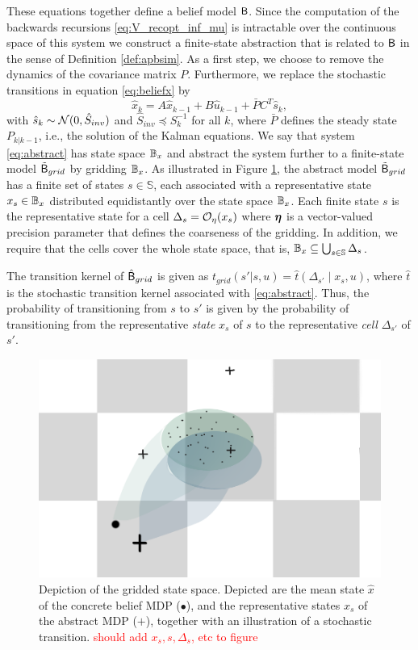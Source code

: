 \documentclass{ifacconf}
\begin{document}
These equations together define a belief model $\mathsf{B}$. Since the computation of the backwards recursions \eqref{eq:V_recopt_inf_mu} is intractable over the continuous space of this system we construct a finite-state abstraction that is related to $\mathsf{B}$ in the sense of Definition \ref{def:apbsim}. As a first step, we choose to remove the dynamics of the covariance matrix $P$. Furthermore, we replace the stochastic transitions in equation \eqref{eq:beliefx} by
\begin{equation}
		\hat x_k  = A\hat x_{k-1} +B\hat u_{k-1} + \bar P  C^T  \hat{s}_k,\label{eq:abstract}
\end{equation}
with $ \hat{s}_k\sim \mathcal{N} (0,\hat{S}_{inv})$ and $\hat{S}_{inv}\preceq S_k^{-1}$ for all $k$, where $\bar P$ defines the steady state $P_{k|k-1}$, i.e., the solution of the Kalman equations. We say that system \eqref{eq:abstract} has state space $\mathbb{B}_{x}$ and abstract the system further to a finite-state model $\tilde {\mathsf{B}}_{grid}$ by gridding $\mathbb{B}_x$. As illustrated in Figure \ref{fig:grid}, the abstract model $\tilde {\mathsf{B}}_{grid}$ has a finite set of states $s \in \mathbb{S}$, each associated with a representative state $x_s \in \mathbb{B}_x$ distributed equidistantly over the state space $\mathbb{B}_x$. Each finite state $s$ is the representative state for a cell $\Delta_{s}= \mathcal{O}_\eta(x_s)$ where ${\boldsymbol{\eta}}$ is a vector-valued precision parameter that defines the coarseness of the gridding. In addition, we require that the cells cover the whole state space, that is, $\mathbb{B}_x \subseteq \bigcup_{s \in \mathbb{S}} \Delta_{s}$.

The transition kernel of $\hat{\mathsf{B}}_{grid}$ is given as $t_{grid}(s'|s,u)=\hat t \left(\Delta_{s'}\mid x_s, u\right)$, where $\hat t$ is the stochastic transition kernel associated with \eqref{eq:abstract}. Thus, the probability of transitioning from $s$ to $s'$ is given by the probability of transitioning from the representative \emph{state} $x_s$ of $s$ to the representative \emph{cell} $\Delta_{s'}$ of $s'$.

\begin{figure}[htp]
\centering
	\includegraphics[width = .6\columnwidth]{figs/grid}
	\caption{Depiction of the gridded state space. Depicted are the mean state $\hat x$ of the concrete belief MDP ($\bullet$), and the representative states $x_s$ of the abstract MDP ($\boldsymbol{+}$), together with an illustration of a stochastic transition. \textcolor{red}{should add $x_s, s, \Delta_s$, etc to figure} }
  \label{fig:grid}
\end{figure}
\end{document}
